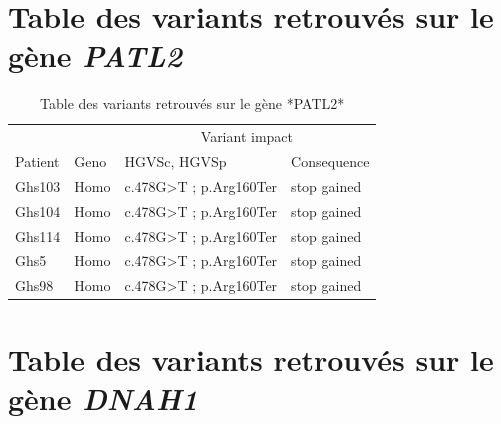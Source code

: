 \documentclass[12pt,twoside]{reedthesis}
\theoremstyle{definition}
\theoremstyle{definition}
\theoremstyle{remark}
\begin{document}
  \chapter{\texorpdfstring{Table des variants retrouvés sur le gène
  \emph{PATL2}}{Table des variants retrouvés sur le gène PATL2}}\label{table-des-variants-retrouves-sur-le-gene-patl2}
  
  \begin{longtable}[t]{llll}
  \caption{\label{tab:tabpatl2}Table des variants retrouvés sur le gène *PATL2*}\\
  \toprule
  \multicolumn{2}{c}{ } & \multicolumn{2}{c}{Variant impact} \\
  \cmidrule(l{2pt}r{2pt}){3-4}
  Patient & Geno & HGVSc, HGVSp & Consequence\\
  \midrule
  Ghs103 & Homo & c.478G>T ; p.Arg160Ter & stop gained\\
  Ghs104 & Homo & c.478G>T ; p.Arg160Ter & stop gained\\
  Ghs114 & Homo & c.478G>T ; p.Arg160Ter & stop gained\\
  Ghs5 & Homo & c.478G>T ; p.Arg160Ter & stop gained\\
  Ghs98 & Homo & c.478G>T ; p.Arg160Ter & stop gained\\
  \bottomrule
  \end{longtable}
  
  \newpage
  
  \chapter{\texorpdfstring{Table des variants retrouvés sur le gène
  \emph{DNAH1}}{Table des variants retrouvés sur le gène DNAH1}}\label{table-des-variants-retrouves-sur-le-gene-dnah1}
  
\end{document}
